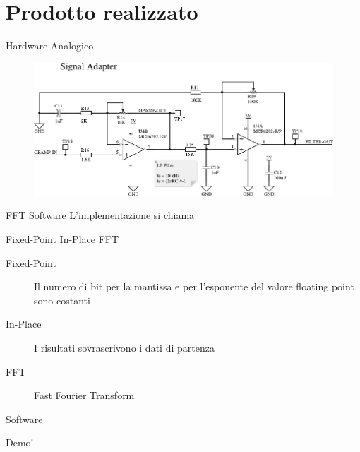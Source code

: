 \documentclass[10pt, xetex, handout]{beamer}
\begin{document}
\section{Prodotto realizzato}
\begin{frame}{Hardware Analogico}
    \begin{figure}
        \includegraphics[width=\linewidth]{figures/circuits/filter-ampl-v2}
    \end{figure}
\end{frame}

\begin{frame}{FFT Software}
    L'implementazione si chiama
    \vfill
    \begin{center}
        \Large Fixed-Point In-Place FFT
    \end{center}
    \vfill
    \begin{description}
        \item [Fixed-Point] Il numero di bit per la mantissa e per
            l'esponente del valore floating point sono costanti
        \item [In-Place] I risultati sovrascrivono i dati di partenza
        \item [FFT] Fast Fourier Transform
    \end{description}
\end{frame}

\begin{frame}{Software}
    \begin{center}
        \Large Demo!
    \end{center}
\end{frame}
\end{document}
